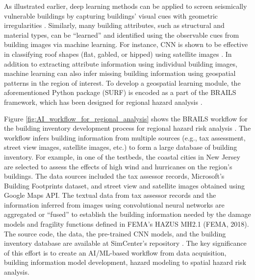 As illustrated earlier, deep learning methods can be applied to screen seismically vulnerable buildings by capturing buildings' visual cues with geometric irregularities \citep{yu2020largescale}. Similarly, many building attributes, such as structural and material types, can be ``learned'' and identified using the observable cues from building images via machine learning. For instance, CNN is shown to be effective in classifying roof shapes (flat, gabled, or hipped) using satellite images \citep{yu2020largescale}. In addition to extracting attribute information using individual building images, machine learning can also infer missing building information using geospatial patterns in the region of interest. To develop a geospatial learning module, the aforementioned Python package (SURF) is encoded as a part of the BRAILS framework, which has been designed for regional hazard analysis \citep{wang2019surf}. 

Figure \ref{fig:AI_workflow_for_regional_analysis} shows the BRAILS workflow for the building inventory development process for regional hazard risk analysis \citep{wang2020flood}. The workflow infers building information from multiple sources (e.g., tax assessment, street view images, satellite images, etc.) to form a large database of building inventory. For example, in one of the testbeds, the coastal cities in New Jersey are selected to assess the effects of high wind and hurricanes on the region's buildings. The data sources included the tax assessor records, Microsoft's Building Footprints dataset, and street view and satellite images obtained using Google Maps API. The textual data from tax assessor records and the information inferred from images using convolutional neural networks are aggregated or ``fused'' to establish the building information needed by the damage models and fragility functions defined in FEMA's HAZUS MH2.1 (FEMA, 2018). The source code, the data, the pre-trained CNN models, and the building inventory database are available at SimCenter's repository \citep{yu2019building}. The key significance of this effort is to create an AI/ML-based workflow from data acquisition, building information model development, hazard modeling to spatial hazard risk analysis. 

